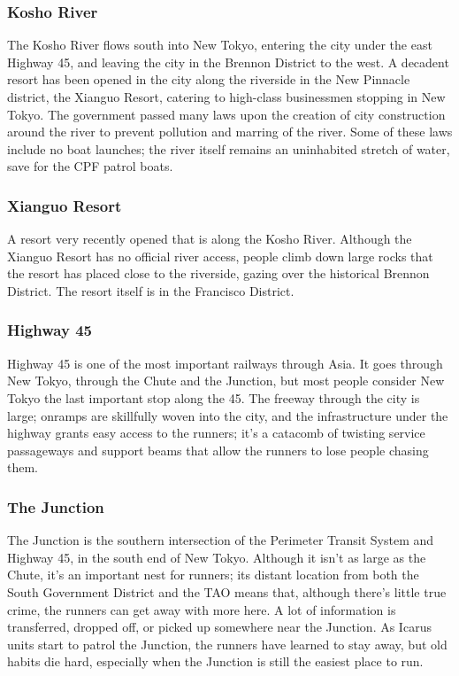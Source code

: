 \documentclass{article}
\begin{document}
\subsubsection{Kosho River}
The Kosho River flows south into New Tokyo, entering the city under the east
Highway 45, and leaving the city in the Brennon District to the west. A decadent resort has been opened in the city along the riverside in the New Pinnacle district, the Xianguo Resort, catering to high-class businessmen stopping in New Tokyo. The government passed many laws upon the creation of city construction around the river to prevent pollution and marring of the river. Some of these laws include no boat launches; the river itself remains an uninhabited stretch of water, save for the CPF patrol boats.
\subsubsection{Xianguo Resort}
A resort very recently opened that is along the Kosho River. Although the
Xianguo Resort has no official river access, people climb down large rocks that the resort has placed close to the riverside, gazing over the historical Brennon District. The resort itself is in the Francisco District.
\subsubsection{Highway 45}
Highway 45 is one of the most important railways through Asia. It goes through
New Tokyo, through the Chute and the Junction, but most people consider New Tokyo the last important stop along the 45. The freeway through the city is large; onramps are skillfully woven into the city, and the infrastructure under the highway grants easy access to the runners; it’s a catacomb of twisting service passageways and support beams that allow the runners to lose people chasing them.
\subsubsection{The Junction}
The Junction is the southern intersection of the Perimeter Transit System and
Highway 45, in the south end of New Tokyo. Although it isn’t as large as the Chute, it’s an important nest for runners; its distant location from both the South Government District and the TAO means that, although there’s little true crime, the runners can get away with more here. A lot of information is transferred, dropped off, or picked up somewhere near the Junction. As Icarus units start to patrol the Junction, the runners have learned to stay away, but old habits die hard, especially when the Junction is still the easiest place to run.
\end{document}

